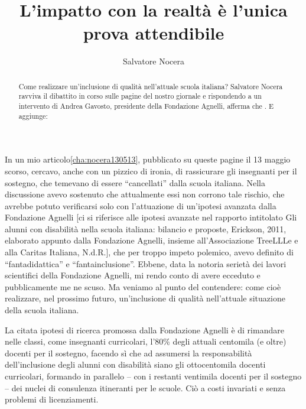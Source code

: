 \author{Salvatore Nocera}
\title{L'impatto con la realtà è l'unica prova attendibile }
\label{cha:nocera280513}
\begin{abstract}
Come realizzare un'inclusione di qualità nell'attuale scuola italiana? Salvatore Nocera ravviva il dibattito in corso sulle pagine del nostro giornale e rispondendo a un intervento di Andrea Gavosto, presidente della Fondazione Agnelli, afferma che . E aggiunge: 
\end{abstract}
\maketitle
In un mio articolo\ref{cha:nocera130513}, pubblicato su queste pagine il 13 maggio scorso, cercavo, anche con un pizzico di ironia, di rassicurare gli insegnanti per il sostegno, che temevano di essere “cancellati” dalla scuola italiana. Nella discussione avevo sostenuto che attualmente essi non corrono tale rischio, che avrebbe potuto verificarsi solo con l'attuazione di un'ipotesi avanzata dalla Fondazione Agnelli [ci si riferisce alle ipotesi avanzate nel rapporto intitolato Gli alunni con disabilità nella scuola italiana: bilancio e proposte, Erickson, 2011, elaborato appunto dalla Fondazione Agnelli, insieme all'Associazione TreeLLLe e alla Caritas Italiana, N.d.R.], che per troppo impeto polemico, avevo definito di “fantadidattica” e “fantainclusione”. Ebbene, data la notoria serietà dei lavori scientifici della Fondazione Agnelli, mi rendo conto di avere ecceduto e pubblicamente me ne scuso.
Ma veniamo al punto del contendere: come cioè realizzare, nel prossimo futuro, un'inclusione di qualità nell'attuale situazione della scuola italiana.

La citata ipotesi di ricerca promossa dalla Fondazione Agnelli è di rimandare nelle classi, come insegnanti curricolari, l'80\% degli attuali centomila (e oltre) docenti per il sostegno, facendo sì che ad assumersi la responsabilità dell'inclusione degli alunni con disabilità siano gli ottocentomila docenti curricolari, formando in parallelo – con i restanti ventimila docenti per il sostegno – dei nuclei di consulenza itineranti per le scuole. Ciò a costi invariati e senza problemi di licenziamenti.

